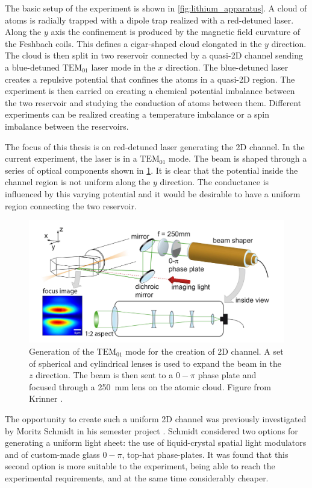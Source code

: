 The basic setup of the experiment is shown in \cref{fig:lithium_apparatus}. A cloud of atoms is radially trapped with a dipole trap realized with a red-detuned laser. Along the $y$ axis the confinement is produced by the magnetic field curvature of the Feshbach coils. This defines a cigar-shaped cloud elongated in the $y$ direction. The cloud is then split in two reservoir connected by a quasi-2D channel sending a blue-detuned $\text{TEM}_{01}$ laser mode in the $x$ direction. The blue-detuned laser creates a repulsive potential that confines the atoms in a quasi-2D region. The experiment is then carried on creating a chemical potential imbalance between the two reservoir and studying the conduction of atoms between them. Different experiments can be realized creating a temperature imbalance or a spin imbalance between the reservoirs.

The focus of this thesis is on red-detuned laser generating the 2D channel. In the current experiment, the laser is in a $\text{TEM}_{01}$ mode. The beam is shaped through a series of optical components shown in \cref{fig:beam_shaper}. It is clear that the potential inside the channel region is not uniform along the $y$ direction. The conductance is influenced by this varying potential and it would be desirable to have a uniform region connecting the two reservoir.

\begin{figure}
    \includegraphics[width=\textwidth]{figures/beam_shaper.png}
    \caption[short]{Generation of the $\text{TEM}_{01}$ mode for the creation of 2D channel. A set of spherical and cylindrical lenses is used to expand the beam in the $z$ direction. The beam is then sent to a $0-\pi$ phase plate and focused through a \SI{250}{mm} lens on the atomic cloud. Figure from Krinner \cite{krinner2015}.}
    \label{fig:beam_shaper}
\end{figure}

The opportunity to create such a uniform 2D channel was previously investigated by Moritz Schmidt in his semester project \cite{schmidt2021}. Schmidt considered two options for generating a uniform light sheet: the use of liquid-crystal spatial light modulators and of custom-made glass $0-\pi$, top-hat phase-plates. It was found that this second option is more suitable to the experiment, being able to reach the experimental requirements, and at the same time considerably cheaper.

